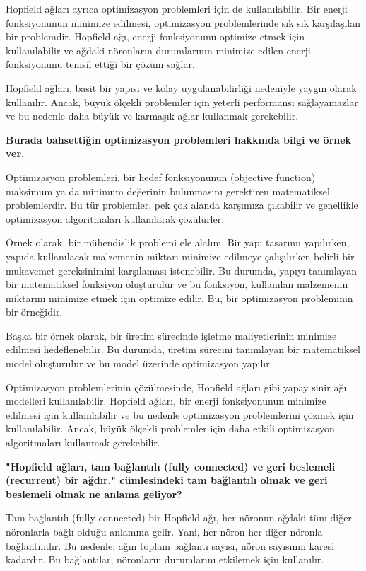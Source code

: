 \documentclass[11pt]{article}
\begin{document}
Hopfield ağları ayrıca optimizasyon problemleri için de kullanılabilir. Bir enerji fonksiyonunun minimize edilmesi, optimizasyon problemlerinde sık sık karşılaşılan bir problemdir. Hopfield ağı, enerji fonksiyonunu optimize etmek için kullanılabilir ve ağdaki nöronların durumlarının minimize edilen enerji fonksiyonunu temsil ettiği bir çözüm sağlar.

Hopfield ağları, basit bir yapısı ve kolay uygulanabilirliği nedeniyle yaygın olarak kullanılır. Ancak, büyük ölçekli problemler için yeterli performansı sağlayamazlar ve bu nedenle daha büyük ve karmaşık ağlar kullanmak gerekebilir.

 \textbf{Burada bahsettiğin optimizasyon problemleri hakkında bilgi ve örnek ver.}

 Optimizasyon problemleri, bir hedef fonksiyonunun (objective function) maksimum ya da minimum değerinin bulunmasını gerektiren matematiksel problemlerdir. Bu tür problemler, pek çok alanda karşımıza çıkabilir ve genellikle optimizasyon algoritmaları kullanılarak çözülürler.

Örnek olarak, bir mühendislik problemi ele alalım. Bir yapı tasarımı yapılırken, yapıda kullanılacak malzemenin miktarı minimize edilmeye çalışılırken belirli bir mukavemet gereksinimini karşılaması istenebilir. Bu durumda, yapıyı tanımlayan bir matematiksel fonksiyon oluşturulur ve bu fonksiyon, kullanılan malzemenin miktarını minimize etmek için optimize edilir. Bu, bir optimizasyon probleminin bir örneğidir.

Başka bir örnek olarak, bir üretim sürecinde işletme maliyetlerinin minimize edilmesi hedeflenebilir. Bu durumda, üretim sürecini tanımlayan bir matematiksel model oluşturulur ve bu model üzerinde optimizasyon yapılır.

Optimizasyon problemlerinin çözülmesinde, Hopfield ağları gibi yapay sinir ağı modelleri kullanılabilir. Hopfield ağları, bir enerji fonksiyonunun minimize edilmesi için kullanılabilir ve bu nedenle optimizasyon problemlerini çözmek için kullanılabilir. Ancak, büyük ölçekli problemler için daha etkili optimizasyon algoritmaları kullanmak gerekebilir.

\textbf{"Hopfield ağları, tam bağlantılı (fully connected) ve geri beslemeli (recurrent) bir ağdır." cümlesindeki tam bağlantılı olmak ve geri beslemeli olmak ne anlama geliyor?}

Tam bağlantılı (fully connected) bir Hopfield ağı, her nöronun ağdaki tüm diğer nöronlarla bağlı olduğu anlamına gelir. Yani, her nöron her diğer nöronla bağlantılıdır. Bu nedenle, ağın toplam bağlantı sayısı, nöron sayısının karesi kadardır. Bu bağlantılar, nöronların durumlarını etkilemek için kullanılır.
\end{document}
